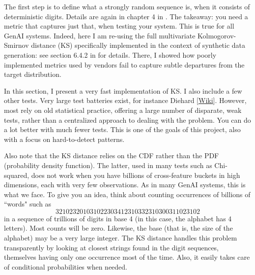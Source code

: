 \documentclass[oneside,10pt]{book}
\begin{document}

\noindent The first step is to define what a strongly random sequence is, when it consists of deterministic digits. Details are again in chapter 4 in \cite{vgchaos}. The takeaway: you need a metric that captures just that, when testing your system. This is true for all GenAI systems. Indeed, here I am re-using the full multivariate 
\textcolor{index}{Kolmogorov-Smirnov distance} (KS) specifically implemented in the context
 of synthetic data generation: see section 6.4.2 in \cite{vgstats} for details. There, I showed how poorly implemented  metrics used by vendors fail to capture subtle departures from the target distribution. 

In this section, I present a very fast implementation of KS. I also include a few other tests. Very large test batteries exist,
 for instance \textcolor{index}{Diehard} [\href{https://en.wikipedia.org/wiki/Diehard_tests}{Wiki}].  
However, most rely on old statistical practice, offering a large number of disparate, weak tests, rather than
 a centralized approach to dealing with the problem. You can do a lot better with much fewer tests. This is one of the goals of this project, also
 with a focus on hard-to-detect patterns.

Also note that the KS distance relies on the CDF rather than the PDF (probability density function). The latter, used in many tests such as 
\textcolor{index}{Chi-squared}, does not  work when you have billions of cross-feature buckets in high dimensions, each with very few observations. 
 As in many GenAI systems, this is what we face.  To give you an idea, think about counting occurrences of billions of
 ``words" such as 
$$321023201031022303412310332310300311023102 
$$
in a sequence of trillions of digits in base 4 (in this case, the alphabet has 4 letters).  Most counts will
 be zero. Likewise, the base (that is, the size of the alphabet) may be a very large integer. The KS distance handles this problem transparently
 by looking at closest strings found in the digit sequences, themselves having only one occurrence most of the time. Also, it easily takes care of conditional probabilities when needed.
\end{document}
